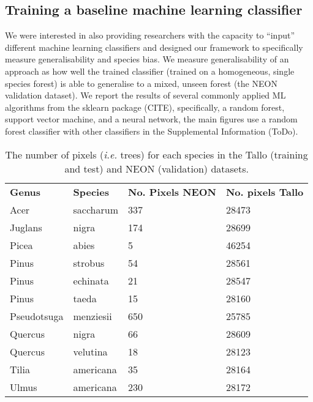 \documentclass[9pt,lineno]{elife}
\begin{document}

\subsection{Training a baseline machine learning classifier}
We were interested in also providing researchers with the capacity to ``input'' different machine learning classifiers and designed our framework to specifically measure generalisability and species bias. We measure generalisability of an approach as how well the trained classifier (trained on a homogeneous, single species forest) is able to generalise to a mixed, unseen forest (the NEON validation dataset). We report the results of several commonly applied ML algorithms from the sklearn package (CITE), specifically, a random forest, support vector machine, and a neural network, the main figures use a random forest classifier with other classifiers in the Supplemental Information (ToDo).



\begin{table}[]
\begin{center}
\begin{tabular}{llll}
\textbf{Genus}       & \textbf{Species}   & \textbf{No. Pixels NEON} & \textbf{No. pixels Tallo} \\

Acer        & saccharum & 337             & 28473            \\
Juglans     & nigra     & 174             & 28699            \\
Picea       & abies     & 5               & 46254            \\
Pinus       & strobus   & 54              & 28561            \\
Pinus       & echinata  & 21              & 28547            \\
Pinus       & taeda     & 15              & 28160            \\
Pseudotsuga & menziesii & 650             & 25785            \\
Quercus     & nigra     & 66              & 28609            \\
Quercus     & velutina  & 18              & 28123            \\
Tilia       & americana & 35              & 28164            \\
Ulmus       & americana & 230             & 28172
\end{tabular}
\label{tab:speciesnum}
\caption{
        The number of pixels (\textit{i.e.} trees) for each species in the Tallo (training and test) and NEON (validation) datasets.
}
\label{tab:tabML}
\end{center}
\end{table}
\end{document}
